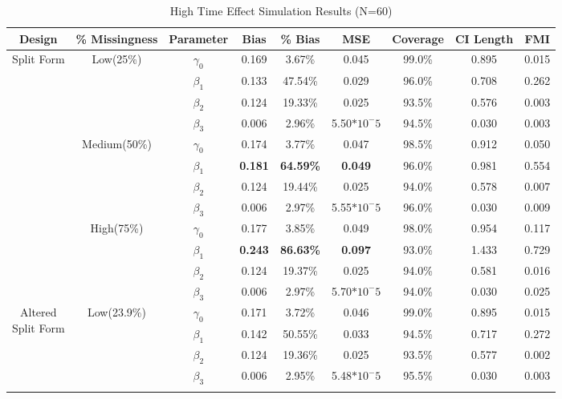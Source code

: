 \documentclass{svjour3}\usepackage[]{graphicx}\usepackage[]{color}
\begin{document}
\begin{table}[p]
	\centering
	\caption{High Time Effect Simulation Results (N=60)}
	\label{tab:table6}
	\setlength{\tabcolsep}{0.1cm}
	\hspace*{-1cm}
	\begin{tabular}{c|c|c|cccccc}
		\toprule
		Design & \% Missingness & Parameter & Bias & \% Bias & MSE & Coverage & CI Length & FMI \\
		\midrule
		\multirow{12}{*}{Split Form}
		& \multirow{4}{*}{Low(25\%)}
		& $\gamma_0$ & 0.169 & 3.67\% & 0.045 & 99.0\% & 0.895 & 0.015 \\
		&& $\beta_1$ & 0.133 & 47.54\% & 0.029 & 96.0\% & 0.708 & 0.262 \\
		&& $\beta_2$ & 0.124 & 19.33\% & 0.025 & 93.5\% & 0.576 & 0.003 \\
		&& $\beta_3$ & 0.006 & 2.96\% & 5.50$*10^-5$ & 94.5\% & 0.030 & 0.003 \\ \cline{2-9} \noalign{\smallskip}
		&\multirow{4}{*}{Medium(50\%)}
		& $\gamma_0$ & 0.174 & 3.77\% & 0.047 & 98.5\% & 0.912 & 0.050 \\
		&& $\beta_1$ & \textbf{0.181} & \textbf{64.59\%} & \textbf{0.049} & 96.0\% & 0.981 & 0.554 \\
		&& $\beta_2$ & 0.124 & 19.44\% & 0.025 & 94.0\% & 0.578 & 0.007 \\
		&& $\beta_3$ & 0.006 & 2.97\% & 5.55$*10^-5$ & 96.0\% & 0.030 & 0.009 \\ \cline{2-9} \noalign{\smallskip}
		& \multirow{4}{*}{High(75\%)}
		& $\gamma_0$ & 0.177 & 3.85\% & 0.049 & 98.0\% & 0.954 & 0.117 \\
		&& $\beta_1$ & \textbf{0.243} & \textbf{86.63\%} & \textbf{0.097} & 93.0\% & 1.433 & 0.729 \\
		&& $\beta_2$ & 0.124 & 19.37\% & 0.025 & 94.0\% & 0.581 & 0.016 \\
		&& $\beta_3$ & 0.006 & 2.97\% & 5.70$*10^-5$ & 94.0\% & 0.030 & 0.025 \\
		\midrule
		\midrule
		\multirow{12}{*}{\parbox{1.75cm}{Altered \\ Split Form}}
		& \multirow{4}{*}{Low(23.9\%)}
		& $\gamma_0$ & 0.171 & 3.72\% & 0.046 & 99.0\% & 0.895 & 0.015 \\
		&& $\beta_1$ & 0.142 & 50.55\% & 0.033 & 94.5\% & 0.717 & 0.272 \\
		&& $\beta_2$ & 0.124 & 19.36\% & 0.025 & 93.5\% & 0.577 & 0.002 \\
		&& $\beta_3$ & 0.006 & 2.95\% & 5.48$*10^-5$ & 95.5\% & 0.030 & 0.003 \\ \cline{2-9} \noalign{\smallskip}

\end{tabular}
\end{table}
\end{document}
